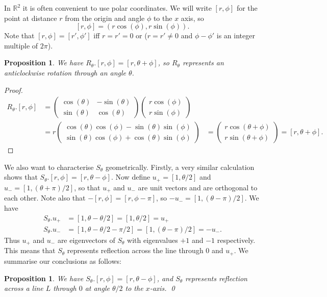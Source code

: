 \documentclass{amsart}
\newcommand{\R}         {{\mathbb{R}}}
\newcommand{\blm}       {\left(\begin{array}{cc}}
\newcommand{\elm}       {\end{array}\right)}
\newcommand{\cv}[1]     {\left(\begin{array}{c}#1\end{array}\right)}
\renewcommand{\:}{\colon}
\newtheorem{proposition}[theorem]{Proposition}
\theoremstyle{definition}
\begin{document}
In $\R^2$ it is often convenient to use polar coordinates.  We will
write $[r,\phi]$ for the point at distance $r$ from the origin and
angle $\phi$ to the $x$ axis, so
\[ [r,\phi] = (r\cos(\phi), r\sin(\phi)). \]
Note that $[r,\phi]=[r',\phi']$ iff $r=r'=0$ or
($r=r'\neq 0$ and $\phi-\phi'$ is an integer multiple of $2\pi$).

\begin{proposition}\label{prop-R-rot}
 We have $R_\theta.[r,\phi]=[r,\theta+\phi]$, so $R_\theta$ represents an
 anticlockwise rotation through an angle $\theta$.
\end{proposition}
\begin{proof}
 \begin{align*}
  R_\theta.[r,\phi] &=
   \blm \cos(\theta) & -\sin(\theta) \\ \sin(\theta) & \cos(\theta) \elm
   \cv{ r\cos(\phi) \\ r\sin(\phi) } \\
  &= r\cv{\cos(\theta)\cos(\phi)-\sin(\theta)\sin(\phi) \\
          \sin(\theta)\cos(\phi)+\cos(\theta)\sin(\phi)}
  &= \cv{r\cos(\theta+\phi)\\ r\sin(\theta+\phi)} = [r,\theta+\phi].
 \end{align*}
\end{proof}

We also want to characterise $S_\theta$ geometrically.  Firstly, a very
similar calculation shows that $S_\theta.[r,\phi]=[r,\theta-\phi]$.  Now
define $u_+=[1,\theta/2]$ and $u_-=[1,(\theta+\pi)/2]$, so that $u_+$ and
$u_-$ are unit vectors and are orthogonal to each other.  Note also
that $-[r,\phi]=[r,\phi-\pi]$, so $-u_-=[1,(\theta-\pi)/2]$.  We have
\begin{align*}
 S_\theta.u_+ &= [1,\theta-\theta/2] = [1,\theta/2] = u_+ \\
 S_\theta.u_- &= [1,\theta-\theta/2-\pi/2]=[1,(\theta-\pi)/2]=-u_-.
\end{align*}
Thus $u_+$ and $u_-$ are eigenvectors of $S_\theta$ with eigenvalues
$+1$ and $-1$ respectively.  This means that $S_\theta$ represents
reflection across the line through $0$ and $u_+$.  We summarise our
conclusions as follows:
\begin{proposition}\label{prop-S-ref}
 We have $S_\theta.[r,\phi]=[r,\theta-\phi]$, and $S_\theta$ represents
 reflection across a line $L$ through $0$ at angle $\theta/2$ to the
 $x$-axis. \qed
\end{proposition}
\end{document}
